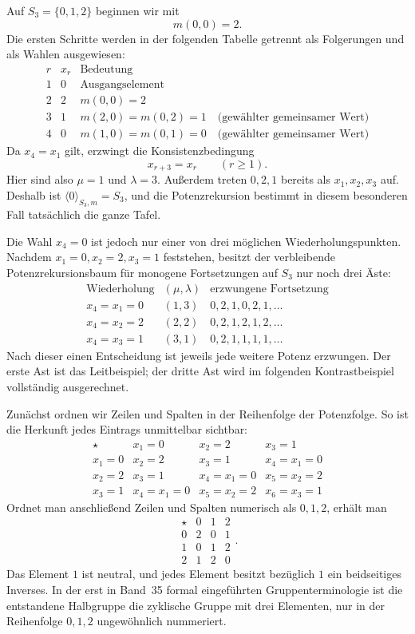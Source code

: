 \documentclass[main.tex]{subfiles}
\begin{document}
Auf \(S_3=\{0,1,2\}\) beginnen wir mit
\[
  m(0,0)=2.
\]
Die ersten Schritte werden in der folgenden Tabelle getrennt als
Folgerungen und als Wahlen ausgewiesen:
\[
\begin{array}{c|c|l}
r&x_r&\text{Bedeutung}\\\hline
1&0&\text{Ausgangselement}\\
2&2&m(0,0)=2\\
3&1&m(2,0)=m(0,2)=1\quad\text{(gewählter gemeinsamer Wert)}\\
4&0&m(1,0)=m(0,1)=0\quad\text{(gewählter gemeinsamer Wert)}
\end{array}
\]
Da \(x_4=x_1\) gilt, erzwingt die Konsistenzbedingung
\[
  x_{r+3}=x_r
  \qquad(r\geq1).
\]
Hier sind also \(\mu=1\) und \(\lambda=3\).  Außerdem treten \(0,2,1\)
bereits als \(x_1,x_2,x_3\) auf.  Deshalb ist
\(\langle0\rangle_{S_3,m}=S_3\), und die Potenzrekursion bestimmt in diesem
besonderen Fall tatsächlich die ganze Tafel.

Die Wahl \(x_4=0\) ist jedoch nur einer von drei möglichen
Wiederholungspunkten.  Nachdem \(x_1=0,x_2=2,x_3=1\) feststehen, besitzt der
verbleibende Potenzrekursionsbaum für monogene Fortsetzungen auf \(S_3\) nur
noch drei Äste:
\[
\begin{array}{c|c|c}
\text{Wiederholung}&(\mu,\lambda)&\text{erzwungene Fortsetzung}\\\hline
x_4=x_1=0&(1,3)&0,2,1,0,2,1,\ldots\\
x_4=x_2=2&(2,2)&0,2,1,2,1,2,\ldots\\
x_4=x_3=1&(3,1)&0,2,1,1,1,1,\ldots
\end{array}
\]
Nach dieser einen Entscheidung ist jeweils jede weitere Potenz erzwungen.
Der erste Ast ist das Leitbeispiel; der dritte Ast wird im folgenden
Kontrastbeispiel vollständig ausgerechnet.

Zunächst ordnen wir Zeilen und Spalten in der Reihenfolge der Potenzfolge.
So ist die Herkunft jedes Eintrags unmittelbar sichtbar:
\[
\boxed{
\begin{array}{c|ccc}
\star&x_1=0&x_2=2&x_3=1\\\hline
x_1=0&x_2=2&x_3=1&x_4=x_1=0\\
x_2=2&x_3=1&x_4=x_1=0&x_5=x_2=2\\
x_3=1&x_4=x_1=0&x_5=x_2=2&x_6=x_3=1
\end{array}}
\]
Ordnet man anschließend Zeilen und Spalten numerisch als \(0,1,2\), erhält
man
\[
\begin{array}{c|ccc}
\star&0&1&2\\\hline
0&2&0&1\\
1&0&1&2\\
2&1&2&0
\end{array}.
\]
Das Element \(1\) ist neutral, und jedes Element besitzt bezüglich \(1\) ein
beidseitiges Inverses.  In der erst in Band~35 formal eingeführten
Gruppenterminologie ist die entstandene Halbgruppe die zyklische Gruppe mit
drei Elementen, nur in der Reihenfolge \(0,1,2\) ungewöhnlich nummeriert.
\end{document}
